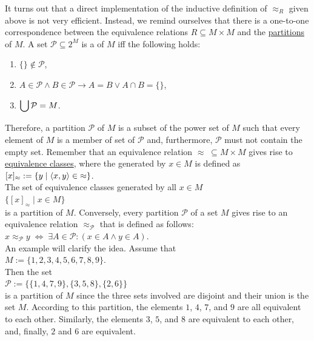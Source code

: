 It turns out that a direct implementation of the inductive definition of $\approx_R$ given above is
not very efficient.  Instead, we remind ourselves that there is a one-to-one correspondence
between the equivalence relations $R \subseteq M \times M$ and the
\href{https://en.wikipedia.org/wiki/Partition_of_a_set}{partitions} of $M$.  A set 
$\mathcal{P} \subseteq 2^M$ is a  of $M$ iff the following holds:
\begin{enumerate}
\item $\{\} \not\in \mathcal{P}$,
\item $A \in \mathcal{P} \wedge B \in \mathcal{P} \rightarrow A = B \vee A \cap B = \{\}$,
\item $\displaystyle\bigcup \mathcal{P} = M$.
\end{enumerate}
Therefore, a partition $\mathcal{P}$ of $M$ is a subset of the power set of $M$ such that
every element of $M$ is a member of  set of $\mathcal{P}$ and, furthermore, $\mathcal{P}$ must not contain the
empty set.  Remember that an equivalence relation 
$\approx \;\subseteq M \times M$ gives rise to
\href{https://en.wikipedia.org/wiki/Equivalence_class}{equivalence classes}, 
where the  generated by $x \in M$ is defined as
\\[0.2cm]
\hspace*{1.3cm}
$[x]_\approx := \{ y \mid \pair(x, y) \in\; \approx \}$.
\\[0.2cm]
The set of equivalence classes generated by all $x \in M$ 
\\[0.2cm]
\hspace*{1.3cm}
$\bigl\{ [x]_\approx \;\big|\; x \in M \bigr\}$
\\[0.2cm]
is a partition of $M$.  Conversely, every partition $\mathcal{P}$ of a set $M$ gives rise
to an equivalence relation $\approx_\mathcal{P}$ that is defined as follows:
\\[0.2cm]
\hspace*{1.3cm}
$x \approx_\mathcal{P} y \;\Longleftrightarrow\; \exists A \in \mathcal{P}:(x \in A \wedge y \in A)$.
\\[0.2cm]
An example will clarify the idea.  Assume that
\\[0.2cm]
\hspace*{1.3cm}
$M := \{ 1,2,3,4,5,6,7,8,9 \}$.
\\[0.2cm]
Then the set 
\\[0.2cm]
\hspace*{1.3cm}
$\mathcal{P} := \bigl\{ \{ 1, 4, 7, 9\}, \{3, 5, 8\}, \{2, 6\} \bigr\}$
\\[0.2cm]
is a partition of $M$ since the three sets involved are disjoint and their union is the set $M$.
According to this partition, the elements $1$, $4$, $7$, and $9$ are all
equivalent to each other.  Similarly, the elements $3$, $5$, and $8$ are equivalent to each other,
and, finally, $2$ and $6$ are equivalent.

